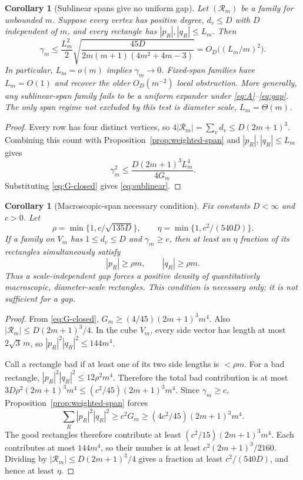 \documentclass[11pt]{article}
\newtheorem{corollary}[theorem]{Corollary}
\theoremstyle{definition}
\theoremstyle{remark}
\begin{document}
\begin{corollary}[Sublinear spans give no uniform gap]\label{cor:sublinear}
Let $(\mathcal R_m)$ be a family for unbounded $m$.  Suppose every vertex has
positive degree, $d_v\leq D$ with $D$ independent of $m$, and every rectangle
has $|p_R|,|q_R|\leq L_m$.  Then
\begin{equation}\label{eq:sublinear}
 \gamma_m\leq
 \frac{L_m^2}{2}
 \sqrt{\frac{45D}{2m(m+1)(4m^2+4m-3)}}
 =O_D\bigl((L_m/m)^2\bigr).
\end{equation}
In particular, $L_m=o(m)$ implies $\gamma_m\to0$.  Fixed-span families have
$L_m=O(1)$ and recover the older $O_D(m^{-2})$ local obstruction.  More
generally, any sublinear-span family fails to be a uniform expander under
\eqref{eq:A}--\eqref{eq:gap}.  The only span regime not excluded by this
test is diameter scale, $L_m=\Theta(m)$.
\end{corollary}

\begin{proof}
Every row has four distinct vertices, so
$4|\mathcal R_m|=\sum_vd_v\leq D(2m+1)^3$.  Combining this count with
Proposition~\ref{prop:weighted-span} and $|p_R|,|q_R|\leq L_m$ gives
\[
 \gamma_m^2\leq \frac{D(2m+1)^3L_m^4}{4G_m}.
\]
Substituting \eqref{eq:G-closed} gives \eqref{eq:sublinear}.
\end{proof}

\begin{corollary}[Macroscopic-span necessary condition]\label{cor:macro}
Fix constants $D<\infty$ and $c>0$.  Let
\[
 \rho=\min\{1,c/\sqrt{135D}\},
 \qquad
 \eta=\min\{1,c^2/(540D)\}.
\]
If a family on $V_m$ has $1\leq d_v\leq D$ and $\gamma_m\geq c$, then at
least an $\eta$ fraction of its rectangles simultaneously satisfy
\[
 |p_R|\geq\rho m,\qquad |q_R|\geq\rho m.
\]
Thus a scale-independent gap forces a positive density of quantitatively
macroscopic, diameter-scale rectangles.  This condition is necessary only;
it is not sufficient for a gap.
\end{corollary}

\begin{proof}
From \eqref{eq:G-closed}, $G_m\geq(4/45)(2m+1)^3m^4$.  Also
$|\mathcal R_m|\leq D(2m+1)^3/4$.  In the cube $V_m$, every side vector has
length at most $2\sqrt3\,m$, so $|p_R|^2|q_R|^2\leq144m^4$.

Call a rectangle bad if at least one of its two side lengths is $<\rho m$.
For a bad rectangle, $|p_R|^2|q_R|^2\leq12\rho^2m^4$.  Therefore the total
bad contribution is at most
$3D\rho^2(2m+1)^3m^4\leq(c^2/45)(2m+1)^3m^4$.  Since $\gamma_m\geq c$,
Proposition~\ref{prop:weighted-span} forces
\[
 \sum_R|p_R|^2|q_R|^2\geq c^2G_m
 \geq (4c^2/45)(2m+1)^3m^4.
\]
The good rectangles therefore contribute at least
$(c^2/15)(2m+1)^3m^4$.  Each contributes at most $144m^4$, so their number is
at least $c^2(2m+1)^3/2160$.  Dividing by
$|\mathcal R_m|\leq D(2m+1)^3/4$ gives a fraction at least
$c^2/(540D)$, and hence at least $\eta$.
\end{proof}
\end{document}
